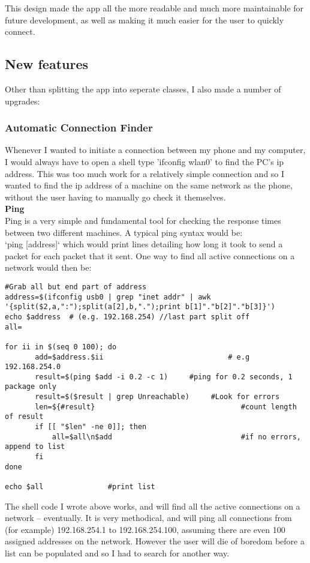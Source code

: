This design  made the app all the more readable and much more maintainable for future development, as well as making it much easier for the user to quickly connect.

\subsection{New features}

Other than splitting the app into seperate classes, I also made a number of upgrades:

\subsubsection{Automatic Connection Finder}
Whenever I wanted to initiate a connection between my phone and my computer, I would always have to open a shell type 'ifconfig wlan0' to find the PC's ip address. This was too much work for a relatively simple connection and so I wanted to find the ip address of a machine on the same network as the phone, without the user having to manually go check it themselves.\\

{\bf Ping}\\
Ping is a very simple and fundamental tool for checking the response times between two different machines. A typical ping syntax would be:\\
`ping [address]` which would print lines detailing how long it took to send a packet for each packet that it sent.
One way to find all active connections on a network would then be:
\vspace{-15pt}
\begin{lstlisting}[title=\bf Code for pinging all addresses on a network]
#Grab all but end part of address
address=$(ifconfig usb0 | grep "inet addr" | awk '{split($2,a,":");split(a[2],b,".");print b[1]"."b[2]"."b[3]}')
echo $address  # (e.g. 192.168.254) //last part split off
all=

for ii in $(seq 0 100); do
       add=$address.$ii                             # e.g 192.168.254.0
       result=$(ping $add -i 0.2 -c 1)     #ping for 0.2 seconds, 1 package only
       result=$($result | grep Unreachable)     #Look for errors
       len=${#result}                                  #count length of result
       if [[ "$len" -ne 0]]; then                   
           all=$all\n$add                              #if no errors, append to list
       fi
done

echo $all               #print list

\end{lstlisting}
The shell code I wrote above works, and will find all the active connections on a network -- eventually. It is very methodical, and will ping all connections from (for example) 192.168.254.1 to 192.168.254.100, assuming there are even 100 assigned addresses on the network. However the user will die of boredom before a list can be populated and so I had to search for another way.\\

